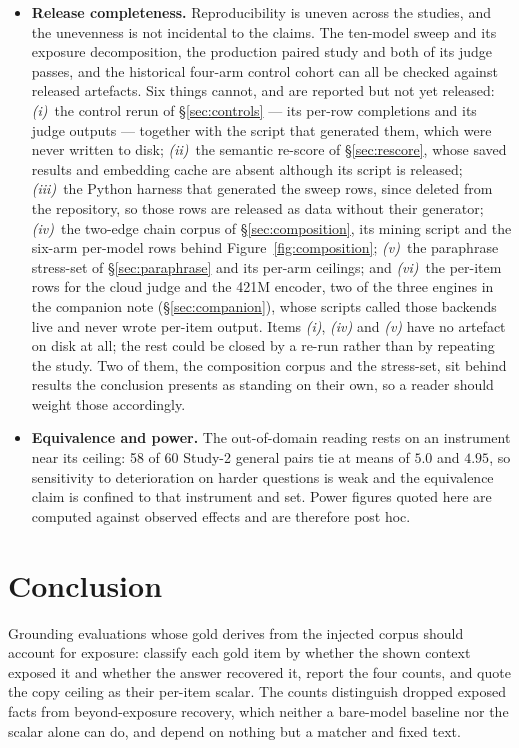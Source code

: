 \documentclass[10pt,twocolumn]{article}
\begin{document}
\begin{itemize}[topsep=2pt,itemsep=2pt,leftmargin=1.4em]
\item \textbf{Release completeness.} Reproducibility is uneven across the studies, and the unevenness is not incidental to the claims. The ten-model sweep and its exposure decomposition, the production paired study and both of its judge passes, and the historical four-arm control cohort can all be checked against released artefacts. Six things cannot, and are reported but not yet released: \emph{(i)}~the control rerun of \S\ref{sec:controls} --- its per-row completions and its judge outputs --- together with the script that generated them, which were never written to disk; \emph{(ii)}~the semantic re-score of \S\ref{sec:rescore}, whose saved results and embedding cache are absent although its script is released; \emph{(iii)}~the Python harness that generated the sweep rows, since deleted from the repository, so those rows are released as data without their generator; \emph{(iv)}~the two-edge chain corpus of \S\ref{sec:composition}, its mining script and the six-arm per-model rows behind Figure~\ref{fig:composition}; \emph{(v)}~the paraphrase stress-set of \S\ref{sec:paraphrase} and its per-arm ceilings; and \emph{(vi)}~the per-item rows for the cloud judge and the 421M encoder, two of the three engines in the companion note (\S\ref{sec:companion}), whose scripts called those backends live and never wrote per-item output. Items \emph{(i)}, \emph{(iv)} and \emph{(v)} have no artefact on disk at all; the rest could be closed by a re-run rather than by repeating the study. Two of them, the composition corpus and the stress-set, sit behind results the conclusion presents as standing on their own, so a reader should weight those accordingly.
\item \textbf{Equivalence and power.} The out-of-domain reading rests on an instrument near its ceiling: 58 of 60 Study-2 general pairs tie at means of $5.0$ and $4.95$, so sensitivity to deterioration on harder questions is weak and the equivalence claim is confined to that instrument and set. Power figures quoted here are computed against observed effects and are therefore post hoc.
\end{itemize}

\section{Conclusion}\label{sec:conclusion}
Grounding evaluations whose gold derives from the injected corpus should account for exposure: classify each gold item by whether the shown context exposed it and whether the answer recovered it, report the four counts, and quote the copy ceiling as their per-item scalar. The counts distinguish dropped exposed facts from beyond-exposure recovery, which neither a bare-model baseline nor the scalar alone can do, and depend on nothing but a matcher and fixed text.
\end{document}
